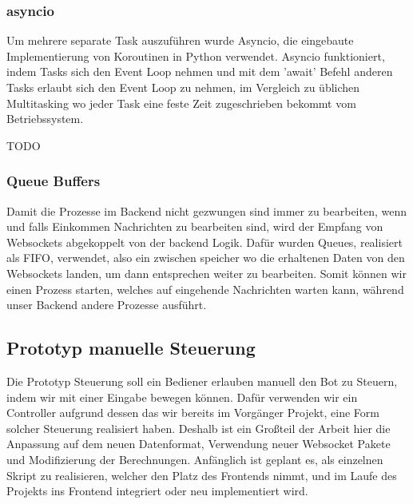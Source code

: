 
\subsubsection{asyncio}
Um mehrere separate Task auszuführen wurde Asyncio,
die eingebaute Implementierung von Koroutinen in Python verwendet.
% 
Asyncio funktioniert, indem Tasks sich den Event Loop nehmen und mit dem 'await' 
Befehl anderen Tasks erlaubt sich den Event Loop zu nehmen, 
im Vergleich zu üblichen Multitasking
wo jeder Task eine feste Zeit zugeschrieben bekommt vom Betriebssystem.

TODO

\subsubsection{Queue Buffers}
Damit die Prozesse im Backend nicht gezwungen sind immer zu bearbeiten, 
wenn und falls Einkommen Nachrichten zu bearbeiten sind, 
wird der Empfang von Websockets abgekoppelt von der backend Logik.
Dafür wurden Queues, realisiert als FIFO, verwendet, also ein zwischen speicher 
wo die erhaltenen Daten von den Websockets landen, 
um dann entsprechen weiter zu bearbeiten.
% 
Somit können wir einen Prozess starten, welches auf eingehende Nachrichten warten kann,
während unser Backend andere Prozesse ausführt.

\subsection{Prototyp manuelle Steuerung}
Die Prototyp Steuerung soll ein Bediener erlauben manuell den Bot zu Steuern,
indem wir mit einer Eingabe bewegen können. 
% 
Dafür verwenden wir ein Controller 
aufgrund dessen das wir bereits im Vorgänger Projekt,
eine Form solcher Steuerung realisiert haben. 
Deshalb ist ein Großteil der Arbeit hier die Anpassung auf dem neuen Datenformat, 
Verwendung neuer Websocket Pakete und Modifizierung der Berechnungen.
% 
Anfänglich ist geplant es, als einzelnen Skript zu realisieren, 
welcher den Platz des Frontends nimmt, 
und im Laufe des Projekts ins Frontend integriert oder neu implementiert wird.


